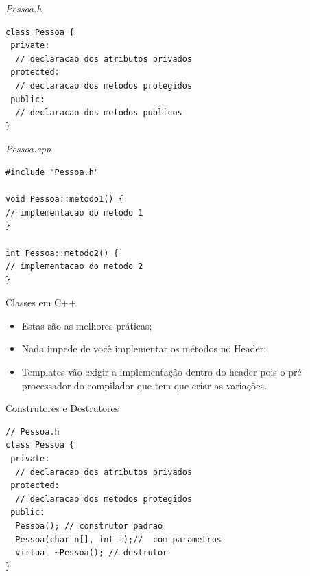 \documentclass[12pt,table,xcolor={dvipsnames}]{beamer}
\begin{document}
\begin{frame}[fragile]{\textit{Pessoa.h}}
\begin{lstlisting}
class Pessoa {
 private:
  // declaracao dos atributos privados
 protected:
  // declaracao dos metodos protegidos
 public:
  // declaracao dos metodos publicos
}
\end{lstlisting}
\end{frame}

\begin{frame}[fragile]{\textit{Pessoa.cpp}}
\begin{lstlisting}
#include "Pessoa.h"

void Pessoa::metodo1() {
// implementacao do metodo 1
}

int Pessoa::metodo2() {
// implementacao do metodo 2
}
\end{lstlisting}
\end{frame}

\begin{frame}{Classes em C++}
\begin{itemize}
\item Estas são as melhores práticas;
\item Nada impede de você implementar os métodos no Header;
\item Templates vão exigir a implementação dentro do header pois o pré-processador do compilador que tem que criar as variações.
\end{itemize}
\end{frame}

\begin{frame}[fragile]{Construtores e Destrutores}
\begin{lstlisting}
// Pessoa.h
class Pessoa {
 private:
  // declaracao dos atributos privados
 protected:
  // declaracao dos metodos protegidos
 public:
  Pessoa(); // construtor padrao
  Pessoa(char n[], int i);//  com parametros
  virtual ~Pessoa(); // destrutor
}
\end{lstlisting}
\end{frame}
\end{document}

